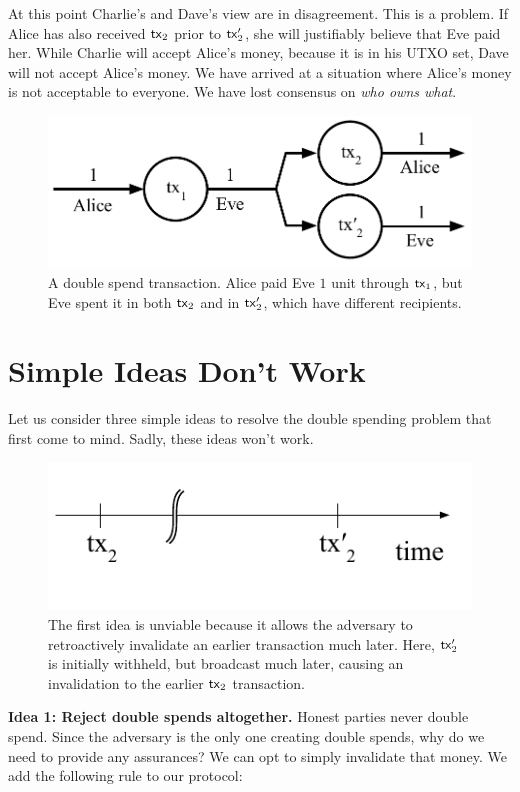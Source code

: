 At this point Charlie's and Dave's view are in disagreement. This is a problem. If Alice has
also received $\mathsf{tx}_2$ prior to $\mathsf{tx}_2'$, she will justifiably believe that Eve paid her.
While Charlie will accept Alice's money, because it is in his UTXO set, Dave will not accept
Alice's money. We have arrived at a situation where Alice's money is not acceptable to everyone.
We have lost consensus on \emph{who owns what}.

\begin{figure}[h]
    \centering
    \includegraphics[width=0.6 \columnwidth,keepaspectratio]{figures/double-spend.pdf}
    \caption{A double spend transaction. Alice paid Eve $1$ unit through $\mathsf{tx}_1$, but Eve spent it in both $\mathsf{tx}_2$ and in $\mathsf{tx}_2'$,
             which have different recipients.}
    \label{fig.double-spend}
\end{figure}

\section{Simple Ideas Don't Work}\label{sec:simple-ideas}

Let us consider three simple ideas to resolve the double spending problem that first come to mind.
Sadly, these ideas won't work.

\begin{figure}[h]
    \centering
    \includegraphics[width=0.4 \columnwidth,keepaspectratio]{figures/simple-idea-1.pdf}
    \caption{The first idea is unviable because it allows the
    adversary to retroactively invalidate an earlier transaction much later. Here, $\mathsf{tx}_2'$
    is initially withheld, but broadcast much later, causing an invalidation to the earlier
    $\mathsf{tx}_2$ transaction.}
    \label{fig.simple-idea-1}
\end{figure}

\noindent
\textbf{Idea 1: Reject double spends altogether.} Honest parties never double spend. Since the adversary is the only one
creating double spends, why do we need to provide any assurances? We can opt to simply invalidate that
money. We add the following rule to our protocol:

